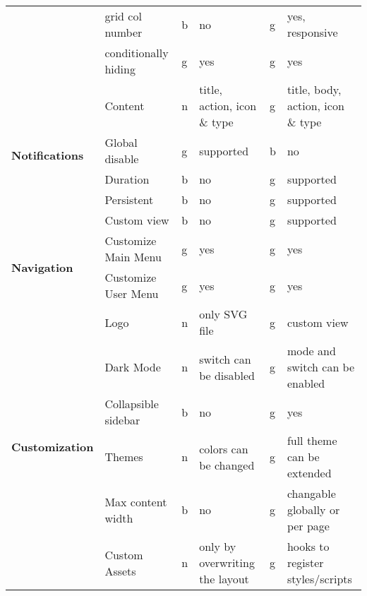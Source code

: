 \begin{table}[]
{\begin{tabular}{llllll}
            & grid col number        & b  & no                             & g  & yes, responsive                         \\
            & conditionally hiding   & g  & yes                            & g  & yes                                     \\
            \hline
            \multirow{5}{*}{\textbf{Notifications}}  & Content                & n  & title, action, icon \& type     & g  & title, body, action, icon \& type        \\
            & Global disable         & g  & supported                      & b  & no                                      \\
            & Duration               & b  & no                             & g  & supported                               \\
            & Persistent             & b  & no                             & g  & supported                               \\
            & Custom view            & b  & no                             & g  & supported                               \\
            \hline
            \multirow{2}{*}{\textbf{Navigation}}     & Customize Main Menu    & g  & yes                            & g  & yes                                     \\
            & Customize User Menu    & g  & yes                            & g  & yes                                     \\
            \hline
            \multirow{10}{*}{\textbf{Customization}} & Logo                   & n  & only SVG file                  & g  & custom view                             \\
            & Dark Mode              & n  & switch can be disabled         & g  & mode and switch can be enabled          \\
            & Collapsible sidebar    & b  & no                             & g  & yes                                     \\
            & Themes                 & n  & colors can be changed          & g  & full theme can be extended              \\
            & Max content width      & b  & no                             & g  & changable globally or per page          \\
            & Custom Assets          & n  & only by overwriting the layout & g  & hooks to register styles/scripts        \\

\end{tabular}}
\end{table}
